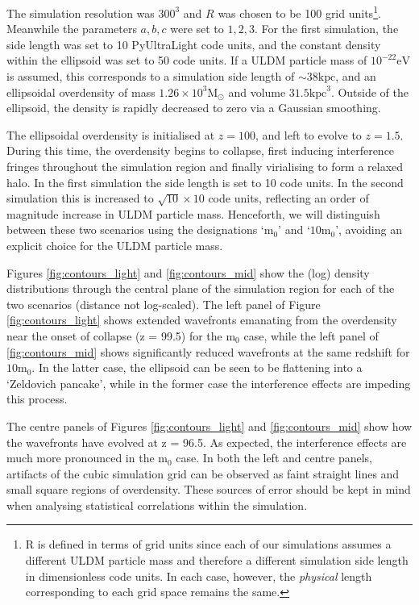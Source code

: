\documentclass[a4paper,11pt]{article}
\begin{document}
The simulation resolution was $300^3$ and $R$ was chosen to be 100 grid units\footnote{R is defined in terms of grid units since each of our simulations assumes a different ULDM particle mass and therefore a different simulation side length in dimensionless code units. In each case, however, the \textit{physical} length corresponding to each grid space remains the same.}. Meanwhile the parameters ${a, b, c}$ were set to ${1,2,3}$. For the first simulation, the side length was set to 10 {\sc PyUltraLight} code units, and the constant density within the ellipsoid was set to 50 code units. If a ULDM particle mass of $10^{-22}\mathrm{eV}$ is assumed, this corresponds to a simulation side length of $\sim 38 \mathrm{kpc}$, and an ellipsoidal overdensity of mass $1.26\times 10^3 \mathrm{M}_{\odot}$ and volume $31.5 \mathrm{kpc}^3$. Outside of the ellipsoid, the density is rapidly decreased to zero via a Gaussian smoothing.

The ellipsoidal overdensity is initialised at $z=100$, and left to evolve to $z=1.5$. During this time, the overdensity begins to collapse, first inducing interference fringes throughout the simulation region and finally virialising to form a relaxed halo. In the first simulation the side length is set to 10 code units. In the second simulation this is increased to $\sqrt{10}\times 10$ code units, reflecting an order of magnitude increase in ULDM particle mass. Henceforth, we will distinguish between these two scenarios using the designations `$\mathrm{m}_0$' and `$10 \mathrm{m}_0$', avoiding an explicit choice for the ULDM particle mass. 

Figures \ref{fig:contours_light} and \ref{fig:contours_mid} show the (log) density distributions through the central plane of the simulation region for each of the two scenarios (distance not log-scaled). The left panel of Figure \ref{fig:contours_light} shows extended wavefronts emanating from the overdensity near the onset of collapse (z = 99.5) for the $\mathrm{m}_0$ case, while the left panel of \ref{fig:contours_mid} shows significantly reduced wavefronts at the same redshift for $10 \mathrm{m}_0$. In the latter case, the ellipsoid can be seen to be flattening into a `Zeldovich pancake', while in the former case the interference effects are impeding this process. 

The centre panels of Figures \ref{fig:contours_light} and \ref{fig:contours_mid} show how the wavefronts have evolved at z = 96.5. As expected, the interference effects are much more pronounced in the $\mathrm{m}_0$ case. In both the left and centre panels, artifacts of the cubic simulation grid can be observed as faint straight lines and small square regions of overdensity. These sources of error should be kept in mind when analysing statistical correlations within the simulation. 
\end{document}
